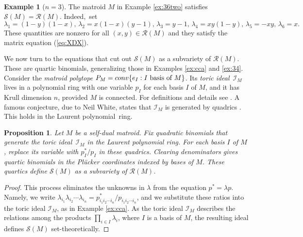 \documentclass[12pt]{extarticle}
\newtheorem{proposition}[theorem]{Proposition}
\theoremstyle{definition}
\newtheorem{example}[theorem]{Example}
\numberwithin{theorem}{section}
\theoremstyle{plain}\newtheorem{ithm}{Theorem}
\begin{document}
\begin{example}[$n=3$] \label{ex:selfdual36}
The matroid $M$ in Example \ref{ex:36two} satisfies
$\mathcal{S}(M) = \mathcal{R}(M)$. Indeed,~set
$$
\lambda_1 = (1-y)(1-x),\,
\lambda_2 =  x(1-x)(y-1),\,
\lambda_3 =  y-1,\,
\lambda_4 = xy(1-y),\,
\lambda_5 = -xy,\,
\lambda_6 = x.\,
$$
These quantities are nonzero for all $(x,y) \in \mathcal{R}(M)$ and they satisfy
the matrix equation (\ref{eq:XDX}).
\end{example}

We now turn to the equations that 
cut out $\mathcal{S}(M)$ as a subvariety of $\mathcal{R}(M)$.
These are quartic binomials, generalizing those in Examples \ref{ex:cca} 
and \ref{ex:34}. Consider the {\em matroid polytope} $P_M = {\rm conv}\{e_I: I \,\,
\hbox{basis of} \,\,M \}$.
Its {\em toric ideal} $\,\mathcal{I}_M$ lives in a polynomial ring with
one variable $p_I$ for each basis $I$ of $M$, and it has Krull
dimension $n$, provided $M$ is connected.
For definitions and details see \cite[\S 13.2]{INLA}.
A famous conjecture, due to Neil White, states that
$\mathcal{I}_M$ is generated by quadrics \cite[Conjecture 13.16]{INLA}.
This holds in the Laurent polynomial~ring.


\begin{proposition} \label{prop:toricideal}
Let $M$ be a self-dual matroid. Fix quadratic binomials that generate
the toric ideal $\,\mathcal{I}_M$ in the Laurent polynomial ring. For each 
basis $I$ of $M$, replace its variable  with $p^*_I / p_I$ in these quadrics.
Clearing denominators gives quartic binomials in the
Pl\"ucker coordinates indexed by bases of $M$.
These quartics define $\mathcal{S}(M)$ as a subvariety of $\mathcal{R}(M)$.
\end{proposition}

\begin{proof}
This process eliminates the unknowns in $\lambda$ from the equation $p^* = \lambda p$.
Namely, we write $\lambda_{i_1} \lambda_{i_2} \cdots \lambda_{i_n} = 
p^*_{i_1 i_2 \cdots i_n} / p_{i_1 i_2 \cdots i_n}$, and we substitute these
ratios into the toric ideal $\mathcal{I}_M$, as in Example \ref{ex:cca}. As the toric ideal $\mathcal{I}_M$ describes the relations among the products $\prod_{i\in I}\lambda_{i}$, where $I$ is a basis of $M$, the 
resulting ideal defines $\mathcal{S}(M)$ set-theoretically.
\end{proof}
\end{document}

